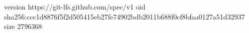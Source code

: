version https://git-lfs.github.com/spec/v1
oid sha256:ccc1d8876f5f2d505415eb27fe74902bdb2011b688f0cf8bfaa0127a51d32937
size 2796368
